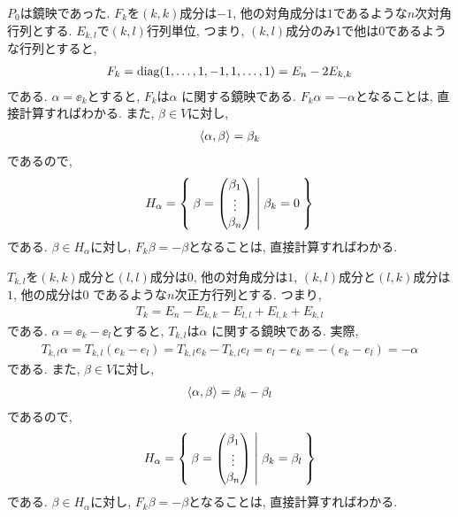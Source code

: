 \begin{example}
  $P_0$は鏡映であった.
  $F_k$を$(k,k)$成分は$-1$, 他の対角成分は$1$であるような$n$次対角行列とする.
 $E_{k,l}$で$(k,l)$行列単位, つまり, $(k,l)$成分のみ1で他は0であるような行列とすると,
  \begin{align*}
    F_k = \operatorname{diag}(1,\ldots,1,-1,1,\ldots,1)=E_n-2E_{k,k}
  \end{align*}
  である.
  $\alpha=\ee_k$とすると, $F_k$は$\alpha$ に関する鏡映である.
  $F_k \alpha = -\alpha$となることは, 直接計算すればわかる.
  また, $\beta\in V$に対し,
  \begin{align*}
    \Braket{\alpha,\beta}= \beta_k 
  \end{align*}
  であるので,
  \begin{align*}
    H_\alpha = \Set{
      \beta=
      \begin{pmatrix}
        \beta_1\\
        \vdots\\
        \beta_n
      \end{pmatrix}
      | \beta_k=0}
  \end{align*}
  である.  $\beta\in H_\alpha$に対し, 
  $F_k \beta = -\beta$となることは, 直接計算すればわかる.
\end{example}

\begin{example}
  $T_{k,l}$を$(k,k)$成分と$(l,l)$成分は$0$, 他の対角成分は$1$,
$(k,l)$成分と$(l,k)$成分は$1$, 他の成分は$0$
  であるような$n$次正方行列とする.
  つまり,
  \begin{align*}
    T_k =E_n-E_{k,k}-E_{l,l}+E_{l,k}+E_{k,l}
  \end{align*}
  である.
  $\alpha=\ee_k-\ee_l$とすると, $T_{k,l}$は$\alpha$ に関する鏡映である.
  実際,
  \begin{align*}
    T_{k,l} \alpha = T_{k,l}(e_k-e_l) = T_{k,l}e_k-T_{k,l}e_l = e_l - e_k = -(e_k - e_l) = -\alpha 
  \end{align*}
  である.  
  また, $\beta\in V$に対し,
  \begin{align*}
    \Braket{\alpha,\beta}= \beta_k - \beta_l
  \end{align*}
  であるので,
  \begin{align*}
    H_\alpha = \Set{
      \beta=
      \begin{pmatrix}
        \beta_1\\
        \vdots\\
        \beta_n
      \end{pmatrix}
      | \beta_k=\beta_l}
  \end{align*}
  である.
  $\beta\in H_\alpha$に対し, 
  $F_k \beta = -\beta$となることは, 直接計算すればわかる.
\end{example}



